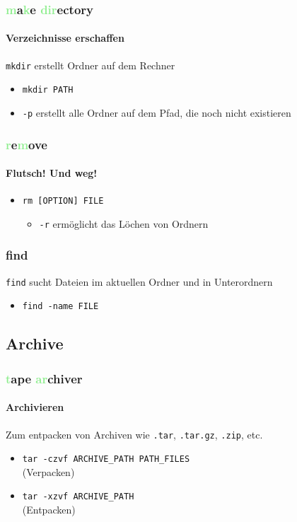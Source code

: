 \documentclass[12pt,utf8]{beamer}
\begin{document}
\begin{frame}
\frametitle{\textcolor{lightGreen}{m}a\textcolor{lightGreen}{k}e \textcolor{lightGreen}{dir}ectory}
\framesubtitle{Verzeichnisse erschaffen}
\texttt{mkdir} erstellt Ordner auf dem Rechner
\begin{itemize}
	\item \texttt{mkdir PATH}
	\item \texttt{-p} erstellt alle Ordner auf dem Pfad, die noch nicht existieren
\end{itemize}
\end{frame}

\begin{frame}
\frametitle{\textcolor{lightGreen}{r}e\textcolor{lightGreen}{m}ove}
\framesubtitle{Flutsch! Und weg!}
\begin{itemize}
	\item \texttt{rm [OPTION] FILE}
	\begin{itemize}[<+->]
		\item \texttt{-r} ermöglicht das Löchen von Ordnern
	\end{itemize}
\end{itemize}
\end{frame}

\begin{frame}
	\frametitle{find}
	\texttt{find} sucht Dateien im aktuellen Ordner und in Unterordnern
	\begin{itemize}
		\item \texttt{find -name FILE}
	\end{itemize}
\end{frame}

\subsection{Archive}
\begin{frame}
\frametitle{\textcolor{lightGreen}{t}ape \textcolor{lightGreen}{ar}chiver}
\framesubtitle{Archivieren}
Zum entpacken von Archiven wie \texttt{.tar}, \texttt{.tar.gz}, \texttt{.zip}, etc. 
\begin{itemize}
	\item \texttt{tar -czvf ARCHIVE\_PATH PATH\_FILES}\\(Verpacken)
	\item \texttt{tar -xzvf ARCHIVE\_PATH}\\(Entpacken)
\end{itemize}
\end{frame}
\end{document}
